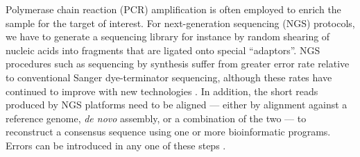 \documentclass[10pt]{article}
\begin{document}
Polymerase chain reaction (PCR) amplification is often employed to enrich the sample for the target of interest.
For next-generation sequencing (NGS) protocols, we have to generate a sequencing library for instance by random shearing of nucleic acids into fragments that are ligated onto special ``adaptors''.
NGS procedures such as sequencing by synthesis suffer from greater error rate relative to conventional Sanger dye-terminator sequencing, although these rates have continued to improve with new technologies \citep{fullerChallengesSequencingSynthesis2009, goodwinComingAgeTen2016, salkEnhancingAccuracyNextgeneration2018}. 
In addition, the short reads produced by NGS platforms need to be aligned --- either by alignment against a reference genome, \emph{de novo} assembly, or a combination of the two --- to reconstruct a consensus sequence using one or more bioinformatic programs.
Errors can be introduced in any one of these steps \citep{beerenwinkelUltradeepSequencingAnalysis2011, oraweAccountingUncertaintyDNA2015}.
\end{document}
